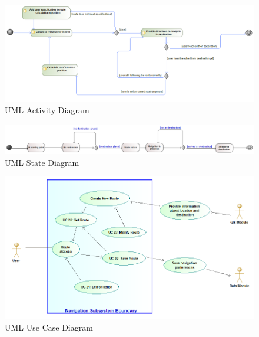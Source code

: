 \documentclass[a4paper,12pt]{article}
\begin{document}
	\begin{figure}
	  \includegraphics[width=\linewidth]{NavigationModuleActivityDiagram.png}
	  \caption{UML Activity Diagram}
	  \label{fig:UML2}
	\end{figure}
	
	\begin{figure}
	  \includegraphics[width=\linewidth]{NavigationModuleStateDiagram.png}
	  \caption{UML State Diagram}
	  \label{fig:UML3}
	\end{figure}
	
	\begin{figure}
	  \includegraphics[width=\linewidth]{NavigationModuleUseCaseDiagram.png}
	  \caption{UML Use Case Diagram}
	  \label{fig:UML4}
	\end{figure}
	
\end{document}
